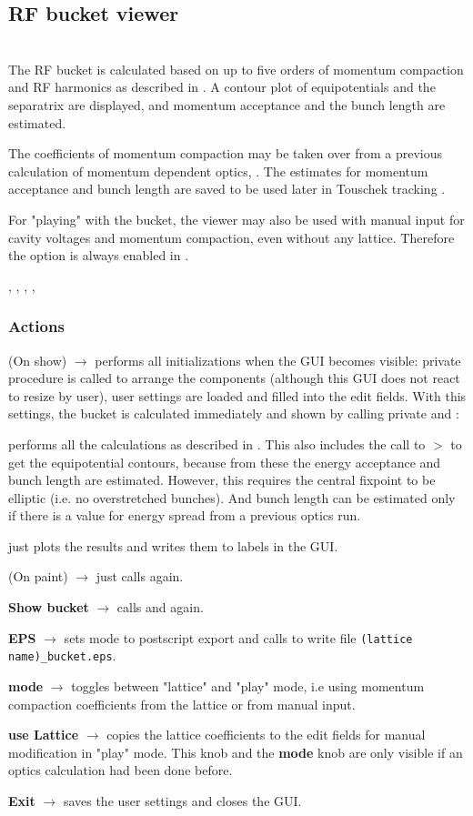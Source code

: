 \documentclass[12pt]{article}
\newcommand\code[1]{{\tt #1}}
\newcommand{\ofld}[1]{\colorbox{black!15}{{{\color{black}\bf #1}}}}
\newcommand{\ofldx}[1]{\colorbox{black!15}{{\color{black}(#1)}}}
\newcommand\guico[1]{{\color{blue}\code{#1}}}
\newcommand{\unico}[1]{{\color{burntorange}\code{#1}}}
\newcommand{\evcod}[2]{\ofld{#1} $\rightarrow$ \guico{#2}}
\newcommand{\evcodx}[2]{\ofldx{#1} $\rightarrow$ \guico{#2}}
\newcommand{\prcod}[2]{\opauni{#1}$>$\unico{#2}}
\newcommand{\opagui}[1]{\colorbox{blue!20}{{\color{black}\code{#1}}}}
\newcommand{\oguih}[2]{\subsection{\label{#2}#1}{\Huge\opagui{#2}}\\}
\newcommand{\ogui}[1]{\hyperref[#1]{\opagui{#1}}}
\newcommand{\opaguif}[1]{\colorbox{violet!30}{{\color{black}\code{#1}}}}
\newcommand{\oguif}[1]{\hyperref[#1]{\opaguif{#1}}}
\newcommand{\opauni}[1]{\colorbox{orange!30}{{\color{black}\code{#1}}}}
\newcommand{\ouni}[1]{\hyperref[#1]{\opauni{#1}}}
\newcommand{\uses}[1]{\flushleft {\bf Uses:} #1}
\newcommand{\desc}[1]{#1}
\newcommand{\act}[1]{\subsubsection*{Actions} #1}
\begin{document}
\oguih{RF bucket viewer}{opabucket}

\desc{
The RF bucket is calculated based on up to five orders of momentum compaction and RF harmonics as described in \cite{inside}. A contour plot of equipotentials and the separatrix are displayed, and momentum acceptance and the bunch length are estimated.

The coefficients of momentum compaction may be taken over from a previous calculation of momentum dependent optics, \ogui{opamomentum}. The estimates for momentum acceptance and bunch length are saved to be used later in Touschek tracking \ogui{opatracktt}.

For "playing" with the bucket, the viewer may also be used with manual input for cavity voltages and momentum compaction, even without any lattice. Therefore the option is always enabled in \ogui{opamenu}.
}

\uses{\ouni{globlib}, \ouni{mathlib}, \ouni{../com/conrect}, \oguif{../com/asfigure}, \ouni{../com/asaux}} 

\act{
\evcodx{On show}{FormShow} performs all initializations when the GUI becomes visible:  private procedure \guico{Layout} is called to arrange the components (although this GUI does not react to resize by user), user settings are loaded and filled into the edit fields. With this settings, the bucket is calculated immediately and shown by calling private \guico{CalcBucket} and \guico{MakePlot}:

\guico{CalcBucket} performs all the calculations as described in \cite{inside}. This also includes the call to \prcod{../com/concrect}{conrec} to get the equipotential contours, because from these the energy acceptance and bunch length are estimated. However, this requires the central fixpoint to be elliptic (i.e. no overstretched bunches). And bunch length can be estimated only if there is a value for energy spread from a previous optics run.

\guico{MakePlot} just plots the results and writes them to labels in the GUI.

\evcodx{On paint}{FormPaint} just calls \guico{MakePlot} again.

\evcod{Show bucket}{butconClick} calls \guico{CalcBucket} and \guico{MakePlot} again.

\evcod{EPS}{butepsClick} sets mode to postscript export and calls \guico{MakePlot} to write file \code{(lattice name)\_bucket.eps}.

\evcod{mode}{butmodClick} toggles between "lattice" and "play" mode, i.e using momentum compaction coefficients from the lattice or from manual input. 

\evcod{use Lattice}{butcopyClick} copies the lattice coefficients to the edit fields for manual modification in "play" mode. This knob and the \ofld{mode} knob are only visible if an optics calculation had been done before.

\evcod{Exit}{butexClick} saves the user settings and closes the GUI.
}
\end{document}
